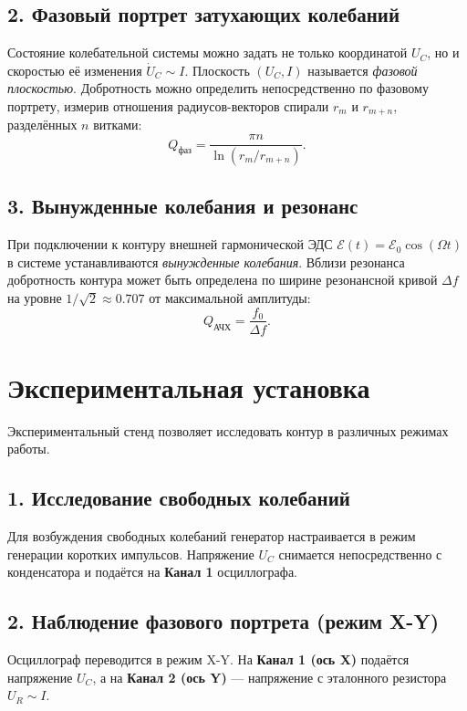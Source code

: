 \documentclass[a4paper,12pt]{extarticle}
\begin{document}
\subsection*{2. Фазовый портрет затухающих колебаний}
Состояние колебательной системы можно задать не только координатой $U_C$, но и скоростью её изменения $\dot{U}_C \sim I$. Плоскость $(U_C, I)$ называется \textit{фазовой плоскостью}. 
Добротность можно определить непосредственно по фазовому портрету, измерив отношения радиусов-векторов спирали $r_m$ и $r_{m+n}$, разделённых $n$ витками:
\begin{equation}
    Q_{\text{фаз}} = \frac{\pi n}{\ln(r_m / r_{m+n})}.
\end{equation}

\subsection*{3. Вынужденные колебания и резонанс}
При подключении к контуру внешней гармонической ЭДС $\mathcal{E}(t) = \mathcal{E}_0 \cos(\Omega t)$ в системе устанавливаются \textit{вынужденные колебания}. Вблизи резонанса добротность контура может быть определена по ширине резонансной кривой $\Delta f$ на уровне $1/\sqrt{2} \approx 0.707$ от максимальной амплитуды:
\begin{equation}
    Q_{\text{АЧХ}} = \frac{f_0}{\Delta f}.
\end{equation}

\newpage
\section*{Экспериментальная установка}

Экспериментальный стенд позволяет исследовать контур в различных режимах работы.

\subsection*{1. Исследование свободных колебаний}
Для возбуждения свободных колебаний генератор настраивается в режим генерации коротких импульсов. Напряжение $U_C$ снимается непосредственно с конденсатора и подаётся на \textbf{Канал 1} осциллографа.

\subsection*{2. Наблюдение фазового портрета (режим X-Y)}
Осциллограф переводится в режим X-Y. На \textbf{Канал 1 (ось X)} подаётся напряжение $U_C$, а на \textbf{Канал 2 (ось Y)} --- напряжение с эталонного резистора $U_R \sim I$.
\end{document}
